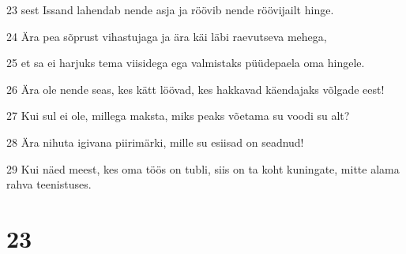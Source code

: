 \par 23 sest Issand lahendab nende asja ja röövib nende röövijailt hinge.
\par 24 Ära pea sõprust vihastujaga ja ära käi läbi raevutseva mehega,
\par 25 et sa ei harjuks tema viisidega ega valmistaks püüdepaela oma hingele.
\par 26 Ära ole nende seas, kes kätt löövad, kes hakkavad käendajaks võlgade eest!
\par 27 Kui sul ei ole, millega maksta, miks peaks võetama su voodi su alt?
\par 28 Ära nihuta igivana piirimärki, mille su esiisad on seadnud!
\par 29 Kui näed meest, kes oma töös on tubli, siis on ta koht kuningate, mitte alama rahva teenistuses.

\chapter{23}

